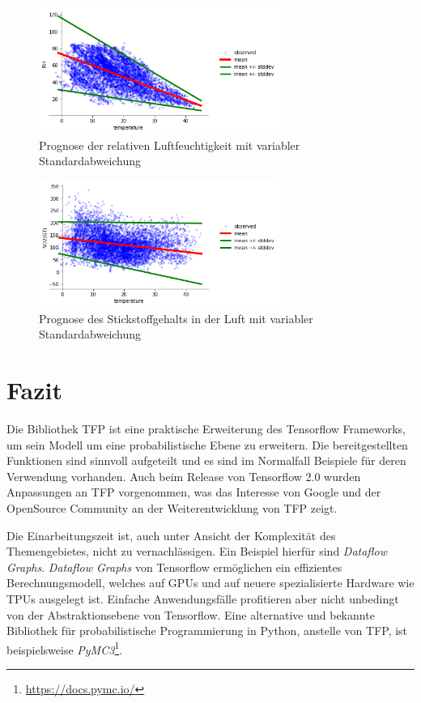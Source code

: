 \documentclass[12pt]{article}
\begin{document}
\begin{figure}[h]
    \centering
    \includegraphics[width=0.7\textwidth]{./figs/with_unc_rh.png}
    \caption{Prognose der relativen Luftfeuchtigkeit mit variabler Standardabweichung}
    \label{fig:with_unc_rh}
\end{figure}

\begin{figure}[h]
    \centering
    \includegraphics[width=0.7\textwidth]{./figs/with_unc_no2.png}
    \caption{Prognose des Stickstoffgehalts in der Luft mit variabler Standardabweichung}
    \label{fig:with_unc_no2}
\end{figure}


\section{Fazit}

Die Bibliothek TFP ist eine praktische Erweiterung des Tensorflow Frameworks, um sein Modell um eine probabilistische Ebene zu erweitern. Die bereitgestellten Funktionen sind sinnvoll aufgeteilt und es sind im Normalfall Beispiele für deren Verwendung vorhanden. Auch beim Release von Tensorflow 2.0 wurden Anpassungen an TFP vorgenommen, was das Interesse von Google und der OpenSource Community an der Weiterentwicklung von TFP zeigt. 

Die Einarbeitungszeit ist, auch unter Ansicht der Komplexität des Themengebietes, nicht zu vernachlässigen. Ein Beispiel hierfür sind \textit{Dataflow Graphs}. \textit{Dataflow Graphs} von Tensorflow ermöglichen ein effizientes Berechnungsmodell, welches auf GPUs und auf neuere spezialisierte Hardware wie TPUs ausgelegt ist. Einfache Anwendungsfälle profitieren aber nicht unbedingt von der Abstraktionsebene von Tensorflow. Eine alternative und bekannte Bibliothek für probabilistische Programmierung in Python, anstelle von TFP, ist beispielsweise \textit{PyMC3}\footnote{\url{https://docs.pymc.io/}}.
\end{document}

